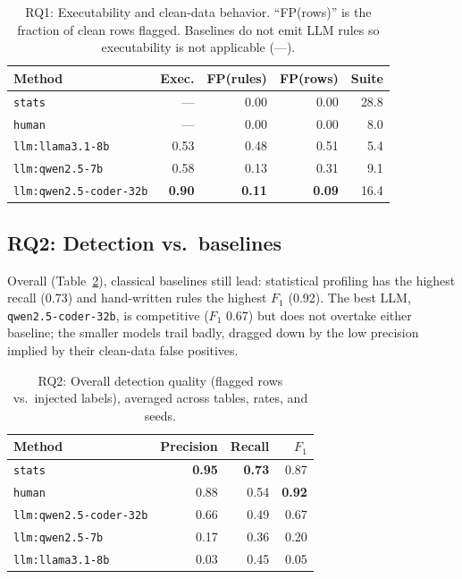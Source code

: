 \documentclass[10pt,twocolumn]{article}
\newcommand{\best}[1]{\textbf{#1}}
\begin{document}
\begin{table}[t]
\centering\small
\caption{RQ1: Executability and clean-data behavior. ``FP(rows)'' is the fraction
of clean rows flagged. Baselines do not emit LLM rules so executability is
not applicable (---).}
\label{tab:exec}
\begin{tabular}{lrrrr}
\toprule
Method & Exec. & FP(rules) & FP(rows) & Suite \\
\midrule
\texttt{stats}              & ---   & 0.00 & 0.00 & 28.8 \\
\texttt{human}              & ---   & 0.00 & 0.00 & 8.0  \\
\texttt{llm:llama3.1-8b}    & 0.53  & 0.48 & 0.51 & 5.4  \\
\texttt{llm:qwen2.5-7b}     & 0.58  & 0.13 & 0.31 & 9.1  \\
\texttt{llm:qwen2.5-coder-32b} & \best{0.90} & \best{0.11} & \best{0.09} & 16.4 \\
\bottomrule
\end{tabular}
\end{table}

\subsection{RQ2: Detection vs.\ baselines}
Overall (Table~\ref{tab:overall}), classical baselines still lead: statistical
profiling has the highest recall (0.73) and hand-written rules the highest $F_1$
(0.92). The best LLM, \texttt{qwen2.5-coder-32b}, is competitive ($F_1$ 0.67) but
does not overtake either baseline; the smaller models trail badly, dragged down
by the low precision implied by their clean-data false positives.

\begin{table}[t]
\centering\small
\caption{RQ2: Overall detection quality (flagged rows vs.\ injected labels),
averaged across tables, rates, and seeds.}
\label{tab:overall}
\begin{tabular}{lrrr}
\toprule
Method & Precision & Recall & $F_1$ \\
\midrule
\texttt{stats}                 & \best{0.95} & \best{0.73} & 0.87 \\
\texttt{human}                 & 0.88 & 0.54 & \best{0.92} \\
\texttt{llm:qwen2.5-coder-32b} & 0.66 & 0.49 & 0.67 \\
\texttt{llm:qwen2.5-7b}        & 0.17 & 0.36 & 0.20 \\
\texttt{llm:llama3.1-8b}       & 0.03 & 0.45 & 0.05 \\
\bottomrule
\end{tabular}
\end{table}
\end{document}
